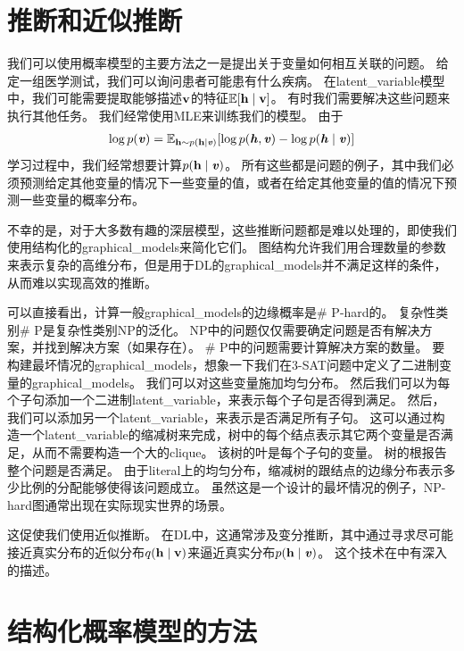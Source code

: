 \section{推断和近似推断}
\label{sec:inference_and_approximate_inference}


我们可以使用概率模型的主要方法之一是提出关于变量如何相互关联的问题。 
给定一组医学测试，我们可以询问患者可能患有什么疾病。
在\gls{latent_variable}模型中，我们可能需要提取能够描述$\mathbf{v}$的特征$\mathbb{E}[\mathbf{h} \mid \mathbf{v}]$。
有时我们需要解决这些问题来执行其他任务。 
我们经常使用\gls{MLE}来训练我们的模型。
由于
\begin{align}
\label{eqn:169}
\log p(\boldsymbol{\mathit{v}}) = \mathbb{E}_{\mathbf{h} \sim p(\mathbf{h}\mid \boldsymbol{\mathit{v}})} [\log p(\boldsymbol{\mathit{h}},\boldsymbol{\mathit{v}}) -  \log p(\boldsymbol{\mathit{h}}\mid\boldsymbol{\mathit{v}})]
\end{align}
学习过程中，我们经常想要计算$p(\mathbf{h}\mid\boldsymbol{\mathit{v}})$。
所有这些都是问题的例子，其中我们必须预测给定其他变量的情况下一些变量的值，或者在给定其他变量的值的情况下预测一些变量的概率分布。

不幸的是，对于大多数有趣的深层模型，这些推断问题都是难以处理的，即使我们使用结构化的\gls{graphical_models}来简化它们。
图结构允许我们用合理数量的参数来表示复杂的高维分布，但是用于\gls{DL}的\gls{graphical_models}并不满足这样的条件，从而难以实现高效的推断。


可以直接看出，计算一般\gls{graphical_models}的边缘概率是\# P-hard的。
复杂性类别\# P是复杂性类别NP的泛化。
NP中的问题仅仅需要确定问题是否有解决方案，并找到解决方案（如果存在）。
\# P中的问题需要计算解决方案的数量。
要构建最坏情况的\gls{graphical_models}，想象一下我们在3-SAT问题中定义了二进制变量的\gls{graphical_models}。
我们可以对这些变量施加均匀分布。
然后我们可以为每个子句添加一个二进制\gls{latent_variable}，来表示每个子句是否得到满足。
然后，我们可以添加另一个\gls{latent_variable}，来表示是否满足所有子句。
这可以通过构造一个\gls{latent_variable}的缩减树来完成，树中的每个结点表示其它两个变量是否满足，从而不需要构造一个大的\gls{clique}。
该树的叶是每个子句的变量。
树的根报告整个问题是否满足。
由于literal上的均匀分布，缩减树的跟结点的边缘分布表示多少比例的分配能够使得该问题成立。
虽然这是一个设计的最坏情况的例子，NP-hard图通常出现在实际现实世界的场景。


这促使我们使用近似推断。
在\gls{DL}中，这通常涉及变分推断，其中通过寻求尽可能接近真实分布的近似分布$q(\mathbf{h}\mid\mathbf{v})$来逼近真实分布$p(\mathbf{h}\mid\boldsymbol{\mathit{v}})$。
这个技术在中有深入的描述。



\section{结构化概率模型的方法}
\label{sec:the_deep_learning_approach_to_structured_probabilistic_models}

